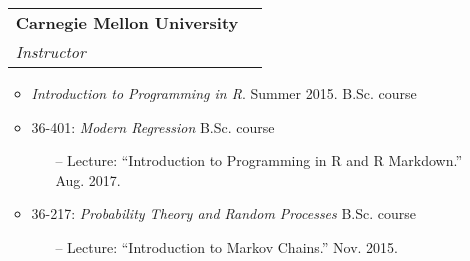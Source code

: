 \documentclass[letterpaper,10pt]{article}
\makeatletter
\newcommand{\subheadingtwolines}[4]{
\begin{tabular*}{6.45in}{l@{\cftdotfill{\cftsecdotsep}\extracolsep{\fill}}r}
#1 & #2 \\
#3 & #4 \\
\end{tabular*}}
\makeatother
\begin{document}
\vspace{-0.05cm}

\begin{itemize}[leftmargin=0.4cm]
\item[] \hspace{-2ex}\subheadingtwolines{\bf Carnegie Mellon University}{}{\it Instructor}{}
\vspace{-0.1cm}
\begin{itemize}[leftmargin=0.4cm, rightmargin=0.3cm]
\item {\it Introduction to Programming in R}. Summer 2015. \hfill B.Sc. course
\end{itemize}


\vspace{0.05cm}
\item[] \hspace{-1.5ex}{\it Guest Lecturer} 
\vspace{-0.075cm}
\begin{itemize}[leftmargin=0.4cm, rightmargin=0.3cm]
\item 36-401: \emph{Modern Regression} \hfill B.Sc. course
\begin{itemize}
\item[--] Lecture: ``Introduction to Programming in R and R Markdown.'' Aug. 2017.
\end{itemize}
\item 36-217: \emph{Probability Theory and Random Processes} \hfill B.Sc. course
\begin{itemize}
\item[--] Lecture: ``Introduction to Markov Chains.'' Nov. 2015.
\end{itemize}
\end{itemize}



\end{itemize}
\end{document}
